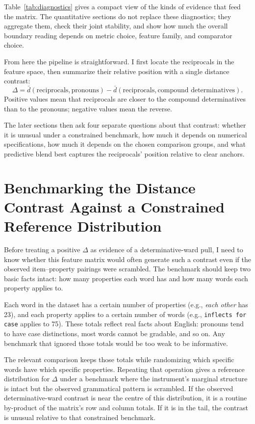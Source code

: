 \documentclass[12pt]{article}
\providecommand{\mention}[1]{\textit{#1}}
\begin{document}
Table~\ref{tab:diagnostics} gives a compact view of the kinds of evidence that feed the matrix. The quantitative sections do not replace these diagnostics; they aggregate them, check their joint stability, and show how much the overall boundary reading depends on metric choice, feature family, and comparator choice.

From here the pipeline is straightforward. I first locate the reciprocals in the feature space, then summarize their relative position with a single distance contrast:
\[
\Delta = \bar d(\text{reciprocals},\text{pronouns})
       - \bar d(\text{reciprocals},\text{compound determinatives}).
\]
Positive values mean that reciprocals are closer to the compound determinatives than to the pronouns; negative values mean the reverse.

The later sections then ask four separate questions about that contrast: whether it is unusual under a constrained benchmark, how much it depends on numerical specifications, how much it depends on the chosen comparison groups, and what predictive blend best captures the reciprocals' position relative to clear anchors.

\FloatBarrier

\section{Benchmarking the Distance Contrast Against a Constrained Reference Distribution}

Before treating a positive \(\Delta\) as evidence of a determinative-ward pull, I need to know whether this feature matrix would often generate such a contrast even if the observed item--property pairings were scrambled. The benchmark should keep two basic facts intact: how many properties each word has and how many words each property applies to.

Each word in the dataset has a certain number of properties (e.g., \mention{each other} has 23), and each property applies to a certain number of words (e.g., \texttt{inflects for case} applies to 75). These totals reflect real facts about English: pronouns tend to have case distinctions, most words cannot be gradable, and so on. Any benchmark that ignored those totals would be too weak to be informative.

The relevant comparison keeps those totals while randomizing which specific words have which specific properties. Repeating that operation gives a reference distribution for \(\Delta\) under a benchmark where the instrument's marginal structure is intact but the observed grammatical pattern is scrambled. If the observed determinative-ward contrast is near the centre of this distribution, it is a routine by-product of the matrix's row and column totals. If it is in the tail, the contrast is unusual relative to that constrained benchmark.
\end{document}
